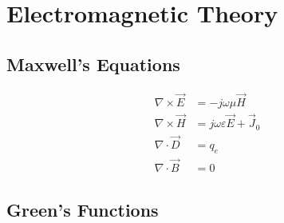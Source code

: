 \section{Electromagnetic Theory}

\subsection{Maxwell's Equations}

\begin{align}
	\nabla \times \vec{E} & = -j\omega\mu\vec{H} \\
	\nabla \times \vec{H} & = j\omega\varepsilon\vec{E} + \vec{J}_0 \\
	\nabla \cdot \vec{D} & = q_e \\
	\nabla \cdot \vec{B} & = 0
\end{align}

\subsection{Green's Functions}

